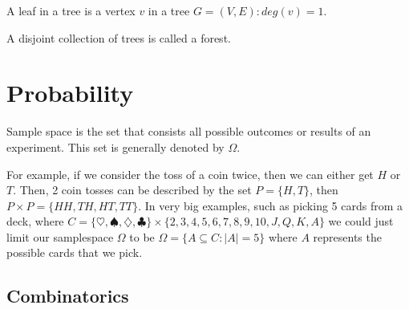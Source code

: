 \documentclass[a4paper]{article}
\theoremstyle{plain}
\theoremstyle{definition}
\newtheorem{defn}{Definition}[section]
\theoremstyle{remark}
\begin{document}
\begin{tcolorbox}[colback=black!3!white,colframe=black!60!white,title=\begin{defn}Leaf \label{Leaf}\end{defn}]
A leaf in a tree is a vertex $v$ in a tree $G=(V,E) : deg(v) = 1$. 
\end{tcolorbox}
\begin{tcolorbox}[colback=black!3!white,colframe=black!60!white,title=\begin{defn}Forest \label{Forest}\end{defn}]
A disjoint collection of trees is called a forest.
\end{tcolorbox}
\section{Probability}
\begin{tcolorbox}[colback=black!3!white,colframe=black!60!white,title=\begin{defn}Sample Space \label{Sample Space}\end{defn}]
Sample space is the set that consists all possible outcomes or results of an experiment. This set is generally denoted by $\Omega$.
\end{tcolorbox}
For example, if we consider the toss of a coin twice, then we can either get $H$ or $T$. Then, 2 coin tosses can be described by the set $P=\{H,T\}$, then $P\times P = \{HH, TH, HT, TT\}$.
In very big examples, such as picking 5 cards from a deck, where $C = \{ \heartsuit, \spadesuit, \diamondsuit, \clubsuit \} \times \{2,3,4,5,6,7,8,9,10,J,Q,K,A\}$ we could just limit our samplespace $\Omega$ to be $\Omega = \{ A \subseteq C : |A| = 5 \}$ where $A$ represents the possible cards that we pick.
\subsection{Combinatorics}
\end{document}
